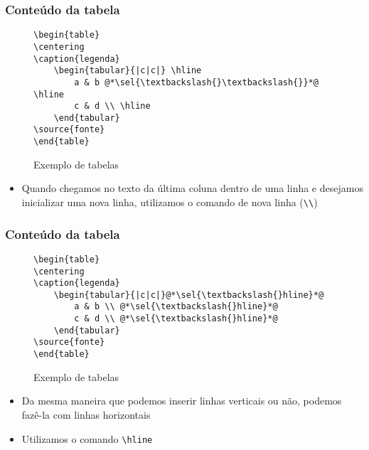 \begin{frame}[fragile] \frametitle{Conteúdo da tabela}
\vspace{-0.5cm}
\begin{figure}[!t]
\caption{Exemplo de tabelas}
\begin{lstlisting}
\begin{table}
\centering
\caption{legenda}
	\begin{tabular}{|c|c|} \hline
		a & b @*\sel{\textbackslash{}\textbackslash{}}*@ \hline
		c & d \\ \hline
	\end{tabular}
\source{fonte}
\end{table}
\end{lstlisting}
\ownsrc
\end{figure}

\begin{itemize}
	\item Quando chegamos no texto da última coluna dentro de uma linha e desejamos inicializar uma nova linha, utilizamos o comando de nova linha (\texttt{\textbackslash{}\textbackslash{}})
\end{itemize}
\end{frame}

\begin{frame}[fragile] \frametitle{Conteúdo da tabela}
\vspace{-0.5cm}
\begin{figure}[!t]
\caption{Exemplo de tabelas}
\begin{lstlisting}
\begin{table}
\centering
\caption{legenda}
	\begin{tabular}{|c|c|}@*\sel{\textbackslash{}hline}*@
		a & b \\ @*\sel{\textbackslash{}hline}*@
		c & d \\ @*\sel{\textbackslash{}hline}*@
	\end{tabular}
\source{fonte}
\end{table}
\end{lstlisting}
\ownsrc
\end{figure}

\begin{itemize}
	\item Da mesma maneira que podemos inserir linhas verticais ou não, podemos fazê-la com linhas horizontais
	\item Utilizamos o comando \texttt{\textbackslash{}hline}
\end{itemize}
\end{frame}

